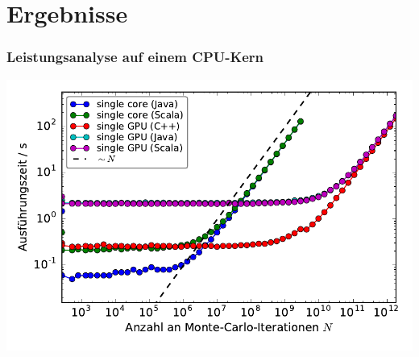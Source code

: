 \section{Ergebnisse}


\begin{frame}
    \frametitle{Leistungsanalyse auf einem CPU-Kern}
    \centerline{\includegraphics[width=0.9\linewidth]{benchmarks-workload-scaling.pdf}}

\end{frame}
